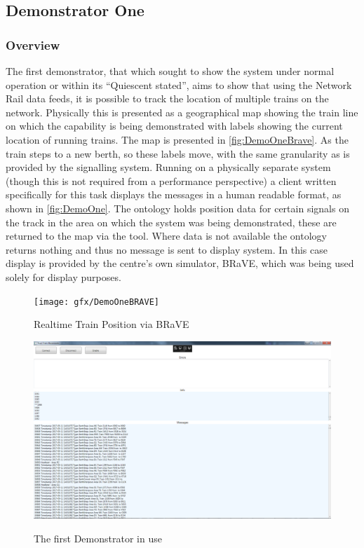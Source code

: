 \subsection{Demonstrator One}
\subsubsection{Overview}
 
The first demonstrator, that which sought to show the system under normal operation or within its ``Quiescent stated'', aims to show that using the Network Rail data feeds, it is possible to track the location of multiple trains on the network. Physically this is presented as a geographical map showing the train line on which the capability is being demonstrated with labels showing the current location of running trains. The map is presented in \autoref{fig:DemoOneBrave}. As the train steps to a new berth, so these labels move, with the same granularity as is provided by the signalling system. Running on a physically separate system (though this is not required from a performance perspective) a client written specifically for this task displays the messages in a human readable format, as shown in \autoref{fig:DemoOne}. The ontology holds position data for certain signals on the track in the area on which the system was being demonstrated, these are returned to the map via the tool. Where data is not available the ontology returns nothing and thus no message is sent to display system. In this case display is provided by the centre's own simulator, BRaVE, which was being used solely for display purposes.

\begin{figure}
\myfloatalign
{\texttt{[image: gfx/DemoOneBRAVE]}} 
\caption[Realtime Train Position via BRaVE]{Realtime Train Position via BRaVE \citep{Wen2015}}
\label{fig:DemoOneBrave}
\end{figure}

\begin{figure}[h]
\myfloatalign
{\includegraphics[width=\linewidth]{gfx/DemoOneScreenShot}} 
\caption[Demonstrator One]{The first Demonstrator in use}
\label{fig:DemoOne}
\end{figure}


